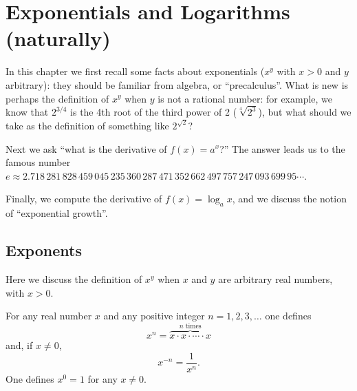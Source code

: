 






\chapter{Exponentials and Logarithms (naturally)}
\label{ch:exponentials}
In this chapter we first recall some facts about exponentials ($x^y$ with $x>0$
and $y$ arbitrary): they should be familiar from algebra, or ``precalculus''.
What is new is perhaps the definition of $x^y$ when $y$ is not a rational
number: for example, we know that $2^{3/4}$ is the 4th root of the third power
of 2 ($\sqrt[4]{2^3}$), but what should we take as the definition of something
like $2^{\sqrt{2}}$?

Next we ask ``what is the derivative of $f(x)=a^x$?'' The answer leads us to the
famous number $e\approx 2.718\, 281\, 828\, 459\, 045\, 235\, 360\, 287\, 471\,
352\, 662\, 497\, 757\, 247\, 093\, 699\, 95\cdots$.

Finally, we compute the derivative of $f(x)=\log_a x$, and we discuss the notion
of ``exponential growth''.


\section{Exponents} %
Here we discuss the definition of $x^y$ when $x$ and $y$ are arbitrary
real numbers, with $x>0$.




For any real number $x$ and any positive integer $n=1, 2, 3, \ldots$ one defines
\[
x^n = \overbrace{x\cdot x\cdot \cdots \cdot x}^{\text{$n$ times}}
\]
and, if $x\neq0$,
\[
x^{-n} = \frac1{x^n}.
\]
One defines $x^0=1$ for any $x\ne0$.




